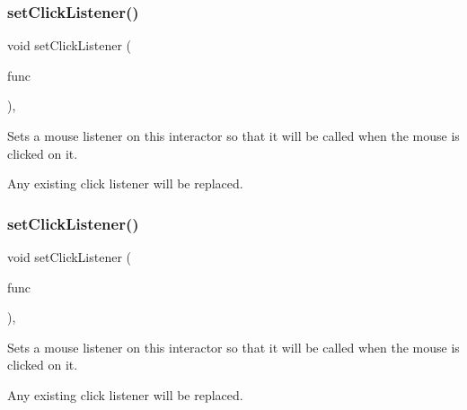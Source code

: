 \subsubsection{\texorpdfstring{set\+Click\+Listener()}{setClickListener()}\hspace{0.1cm}{\footnotesize\ttfamily [1/2]}}
{\footnotesize\ttfamily void set\+Click\+Listener (\begin{DoxyParamCaption}\item[{\mbox{\hyperlink{namespacesgl_ae9f3e9eab70035da1a2b114e21357b25}{G\+Event\+Listener}}}]{func }\end{DoxyParamCaption})\hspace{0.3cm}{\ttfamily [virtual]}, {\ttfamily [inherited]}}



Sets a mouse listener on this interactor so that it will be called when the mouse is clicked on it. 

Any existing click listener will be replaced. \mbox{\label{classsgl_1_1GInteractor_a856414c92df90f56f3877475eb3f8fc4}} 
\subsubsection{\texorpdfstring{set\+Click\+Listener()}{setClickListener()}\hspace{0.1cm}{\footnotesize\ttfamily [2/2]}}
{\footnotesize\ttfamily void set\+Click\+Listener (\begin{DoxyParamCaption}\item[{\mbox{\hyperlink{namespacesgl_a54427ce97bb1c2804e4fe2b0a62e8b17}{G\+Event\+Listener\+Void}}}]{func }\end{DoxyParamCaption})\hspace{0.3cm}{\ttfamily [virtual]}, {\ttfamily [inherited]}}



Sets a mouse listener on this interactor so that it will be called when the mouse is clicked on it. 

Any existing click listener will be replaced. \mbox{\label{classsgl_1_1GInteractor_ab1f5cc0f5cc6bbbd716a526c61f1081d}} 
